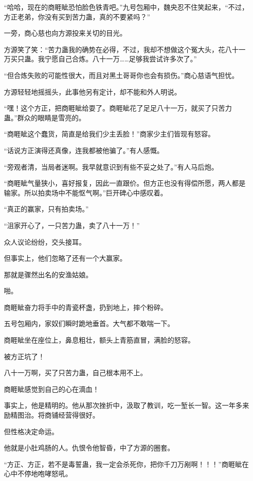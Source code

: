 
\begin{this_body}

“哈哈，现在的商睚眦恐怕脸色铁青吧。”九号包厢中，魏央忍不住笑起来，“不过，方正老弟，你没有买到苦力蛊，真的不要紧吗？”

一旁，商心慈也向方源投来关切的目光。

方源笑了笑：“苦力蛊我的确势在必得，不过，我却不想做这个冤大头，花八十一万买只蛊。我宁愿自己合炼。八十一万……足够我尝试许多次了。”

“但合炼失败的可能性很大，而且对黑土哥哥你也会有损伤。”商心慈语气担忧。

方源轻轻地摇摇头，此事他另有定计，却不能和外人明说。

“嘿！这个方正，把商睚眦给耍了。商睚眦花了足足八十一万，就买了只苦力蛊。”群众的眼睛是雪亮的。

“商睚眦这个蠢货，简直是给我们少主丢脸！”商家少主们皆现有怒容。

“话说方正演得还真像，连我都被他骗了。”有人感慨。

“旁观者清，当局者迷啊。我早就意识到有些不妥之处了。”有人马后炮。

“商睚眦气量狭小，喜好报复，因此一直跟价。但方正也没有得偿所愿，两人都是输家。所以拍卖场中不能怄气啊。”巨开碑心中感叹着。

“真正的赢家，只有拍卖场。”

“沮家开心了，一只苦力蛊，卖了八十一万！”

众人议论纷纷，交头接耳。

但事实上，他们忽略了还有一个大赢家。

那就是骤然出名的安渔姑娘。

啪。

商睚眦奋力将手中的青瓷杯盏，扔到地上，摔个粉碎。

五号包厢内，家奴们瞬时跪地垂首。大气都不敢喘一下。

商睚眦坐在座位上，鼻息粗壮，额头上青筋直冒，满脸的怒容。

被方正坑了！

八十一万啊，买了只苦力蛊，自己根本用不上。

商睚眦感觉到自己的心在滴血！

事实上，他是精明的。他从那次挫折中，汲取了教训，吃一堑长一智。这一年多来励精图治。将商铺经营得很好。

但性格决定命运。

他就是小肚鸡肠的人。仇恨令他智昏，中了方源的圈套。

“方正、方正，若不是毒誓蛊，我一定会杀死你，把你千刀万剐啊！！！”商睚眦在心中不停地咆哮怒吼。


\end{this_body}
